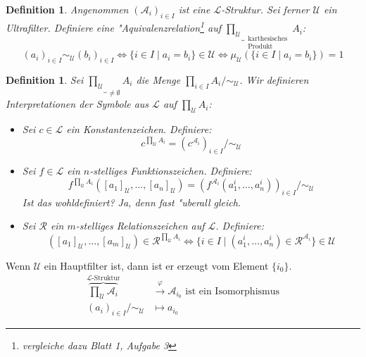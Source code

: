 \documentclass[a4paper,12pt,numbers=noenddot,parskip=full]{scrartcl}
\newcommand{\scrL}{\mathcal{L}}
\newcommand{\scrA}{\mathcal{A}}
\newcommand{\scrU}{\mathcal{U}}
\theoremstyle{dotless}
\newtheorem{definition}[theorem]{Definition}
\begin{document}
	\begin{definition}
		Angenommen $(\scrA_i)_{i \in I}$ ist eine $\scrL$-Struktur. Sei ferner $\scrU$ ein Ultrafilter. Definiere eine "Aquivalenzrelation\footnote{vergleiche dazu Blatt 1, Aufgabe 3} auf $\underbrace{\prod\limits_{\scrU}}_{\substack{\text{karthesisches}\\ \text{Produkt}}} A_i$:
		\begin{equation*}
			(a_i)_{i \in I} \sim_\scrU (b_i)_{i \in I} \Longleftrightarrow \{i \in I \mid a_i = b_i \} \in \scrU \Longleftrightarrow \mu_\scrU(\{i \in I \mid a_i = b_i \})=1
		\end{equation*}
	\end{definition}
	\begin{definition}
		Sei $\underbrace{\prod\limits_\scrU}_{\ne \emptyset} A_i$ die Menge $\prod\limits_{i \in I} A_i / \sim_\scrU$. Wir definieren Interpretationen der Symbole aus $\scrL$ auf $\prod\limits_{\scrU} A_i$:
		\begin{itemize}
			\item Sei $c \in \scrL$ ein Konstantenzeichen. Definiere:
			\begin{equation*}
				c^{\prod\limits_{\scrU} A_i} = (c^{\scrA_i})_{i \in I} / \sim_\scrU
			\end{equation*}
			\item Sei $f \in \scrL$ ein $n$-stelliges Funktionszeichen. Definiere:
			\begin{equation*}
				f^{\prod\limits_{\scrU} A_i} ([a_1]_\scrU, \dots, [a_n]_\scrU)= (f^{\scrA_i}(a_1^i, \dots, a_n^i))_{i \in I} / \sim_\scrU 
			\end{equation*}
			Ist das wohldefiniert? Ja, denn fast "uberall gleich.
			\item Sei $\mathcal{R}$ ein $m$-stelliges Relationszeichen auf $\scrL$. Definiere:
			\begin{equation*}
				([a_1]_\scrU, \dots, [a_m]_\scrU) \in \mathcal{R}^{\prod\limits_{\scrU} A_i} \Longleftrightarrow \{i \in I \mid (a_1^i, \dots, a_n^i) \in \mathcal{R}^{\scrA_i} \} \in \scrU
			\end{equation*}
		\end{itemize}
	\end{definition}
	Wenn $\scrU$ ein Hauptfilter ist, dann ist er erzeugt vom Element $\{i_0 \}$.
	\begin{align*}
		\overbrace{\prod\limits_{\scrU} \scrA_i}^{\scrL \text{-Struktur}} &\overset{\varphi}{\longrightarrow} \scrA_{i_0} \text{ ist ein Isomorphismus}\\
		(a_i)_{i \in I} / \sim_\scrU &\longmapsto a_{i_0}
	\end{align*}
	
\end{document}
